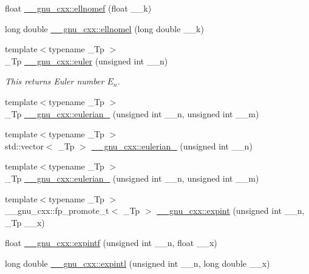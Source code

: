\begin{DoxyCompactItemize}
\item 
float \hyperlink{group__gnu__math__spec__func_gad3ba08e5843ea0ec2bb9ddde3033adff}{\+\_\+\+\_\+gnu\+\_\+cxx\+::ellnomef} (float \+\_\+\+\_\+k)
\item 
long double \hyperlink{group__gnu__math__spec__func_ga0774570b24f654f8ae39e1865613a4e2}{\+\_\+\+\_\+gnu\+\_\+cxx\+::ellnomel} (long double \+\_\+\+\_\+k)
\item 
{\footnotesize template$<$typename \+\_\+\+Tp $>$ }\\\+\_\+\+Tp \hyperlink{group__gnu__math__spec__func_gac956e6457ab7d0d1765d281e73073f55}{\+\_\+\+\_\+gnu\+\_\+cxx\+::euler} (unsigned int \+\_\+\+\_\+n)
\begin{DoxyCompactList}\small\item\em This returns Euler number $ E_n $. \end{DoxyCompactList}\item 
{\footnotesize template$<$typename \+\_\+\+Tp $>$ }\\\+\_\+\+Tp \hyperlink{group__gnu__math__spec__func_gadfd8810a97655d2cdd1b0e3af68a79d3}{\+\_\+\+\_\+gnu\+\_\+cxx\+::eulerian\+\_} (unsigned int \+\_\+\+\_\+n, unsigned int \+\_\+\+\_\+m)
\item 
{\footnotesize template$<$typename \+\_\+\+Tp $>$ }\\std\+::vector$<$ \+\_\+\+Tp $>$ \hyperlink{group__gnu__math__spec__func_ga6597229d2557ccf12fd9c50a66919ceb}{\+\_\+\+\_\+gnu\+\_\+cxx\+::eulerian\+\_} (unsigned int \+\_\+\+\_\+n)
\item 
{\footnotesize template$<$typename \+\_\+\+Tp $>$ }\\\+\_\+\+Tp \hyperlink{group__gnu__math__spec__func_ga9bc456941d5e35cf54ec9c50f2e52884}{\+\_\+\+\_\+gnu\+\_\+cxx\+::eulerian\+\_} (unsigned int \+\_\+\+\_\+n, unsigned int \+\_\+\+\_\+m)
\item 
{\footnotesize template$<$typename \+\_\+\+Tp $>$ }\\\+\_\+\+\_\+gnu\+\_\+cxx\+::fp\+\_\+promote\+\_\+t$<$ \+\_\+\+Tp $>$ \hyperlink{group__gnu__math__spec__func_gadaf9317953b826975da72d1858f01ea5}{\+\_\+\+\_\+gnu\+\_\+cxx\+::expint} (unsigned int \+\_\+\+\_\+n, \+\_\+\+Tp \+\_\+\+\_\+x)
\item 
float \hyperlink{group__gnu__math__spec__func_ga85751691a29807d99e990fcba61312f3}{\+\_\+\+\_\+gnu\+\_\+cxx\+::expintf} (unsigned int \+\_\+\+\_\+n, float \+\_\+\+\_\+x)
\item 
long double \hyperlink{group__gnu__math__spec__func_ga720ca0b275784c8b82193f427a2b3553}{\+\_\+\+\_\+gnu\+\_\+cxx\+::expintl} (unsigned int \+\_\+\+\_\+n, long double \+\_\+\+\_\+x)

\end{DoxyCompactItemize}
